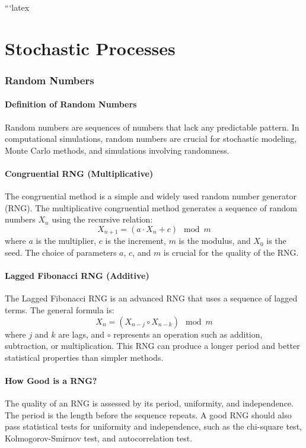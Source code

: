 \documentclass[12pt]{article}
\begin{document}
```latex
\maketitle
\tableofcontents
\newpage

\part{Stochastic Processes}
\section{Random Numbers}
\subsection{Definition of Random Numbers}
Random numbers are sequences of numbers that lack any predictable pattern. In computational simulations, random numbers are crucial for stochastic modeling, Monte Carlo methods, and simulations involving randomness.

\subsection{Congruential RNG (Multiplicative)}
The congruential method is a simple and widely used random number generator (RNG). The multiplicative congruential method generates a sequence of random numbers \( X_n \) using the recursive relation:
\[
X_{n+1} = (a \cdot X_n + c) \mod m
\]
where \( a \) is the multiplier, \( c \) is the increment, \( m \) is the modulus, and \( X_0 \) is the seed. The choice of parameters \( a \), \( c \), and \( m \) is crucial for the quality of the RNG.

\subsection{Lagged Fibonacci RNG (Additive)}
The Lagged Fibonacci RNG is an advanced RNG that uses a sequence of lagged terms. The general formula is:
\[
X_n = (X_{n-j} \circ X_{n-k}) \mod m
\]
where \( j \) and \( k \) are lags, and \( \circ \) represents an operation such as addition, subtraction, or multiplication. This RNG can produce a longer period and better statistical properties than simpler methods.

\subsection{How Good is a RNG?}
The quality of an RNG is assessed by its period, uniformity, and independence. The period is the length before the sequence repeats. A good RNG should also pass statistical tests for uniformity and independence, such as the chi-square test, Kolmogorov-Smirnov test, and autocorrelation test.
\end{document}
